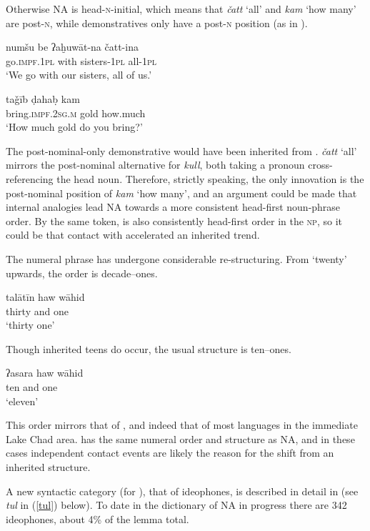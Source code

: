 \documentclass[output=paper]{langsci/langscibook}
\begin{document}
Otherwise NA is head-\textsc{n}-initial, which means that \textit{čatt} ‘all’ and \textit{kam} ‘how many’ are post-\textsc{n}, while {demonstratives} only have a post-\textsc{n} position (as in ).

\ea \gll numšu be ʔaḫuwāt-na čatt-ina\\
     go.\textsc{impf.1pl} with sisters-1\textsc{pl} all-\textsc{1pl}\\
\glt ‘We go with our sisters, all of us.’
\z

\ea \gll taǧīb ḍahaḅ kam\\
     bring.\textsc{impf.2sg.m} gold how.much\\
\glt ‘How much gold do you bring?’
\z

The post-nominal-only demonstrative would have been inherited from . \textit{čatt} ‘all’ mirrors the post-nominal alternative for \textit{kull}, both taking a pronoun cross-referencing the head noun. Therefore, strictly speaking, the only innovation is the post-nominal position of \textit{kam} ‘how many’, and an argument could be made that internal analogies lead NA towards a more consistent head-first noun-phrase order. By the same token,  is also consistently head-first order in the \textsc{np}, so it could be that contact with  accelerated an inherited trend.

The numeral phrase has undergone considerable re-structuring. From `twenty' upwards, the order is decade--ones.

\ea \gll talātīn haw wāhid\\
     thirty and one\\
\glt ‘thirty one’
\z

Though inherited teens do occur, the usual structure is ten--ones.

\ea \gll ʔasara haw wāhid\\
     ten and one\\
\glt ‘eleven’
\z

This order mirrors that of  \citep[203]{Hutchison1981}, and indeed that of most languages in the immediate {Lake Chad} area.   has the same numeral order and structure as NA, and in these cases independent contact events are likely the reason for the shift from an inherited structure.


A new syntactic category (for ), that of {ideophones}, is described in detail in \citet{OwensHassan2004} (see \textit{tul} in (\ref{tul}) below). To date in the dictionary of NA in progress there are 342 {ideophones}, about 4\% of the lemma total.
\end{document}
